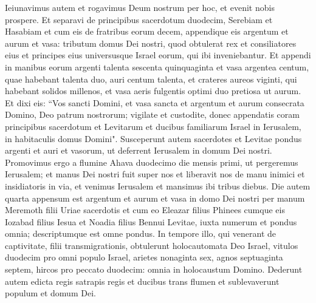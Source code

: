 \begin{biblechapter}
\verse Ieiunavimus autem et rogavimus Deum nostrum per hoc, et evenit nobis prospere. 
\verse Et separavi de principibus sacerdotum duodecim, Serebiam et Hasabiam et cum eis de fratribus eorum decem, 
\verse appendique eis argentum et aurum et vasa: tributum domus Dei nostri, quod obtulerat rex et consiliatores eius et principes eius universusque Israel eorum, qui ibi inveniebantur. 
\verse Et appendi in manibus eorum argenti talenta sescenta quinquaginta et vasa argentea centum, quae habebant talenta duo, auri centum talenta, 
\verse et crateres aureos viginti, qui habebant solidos millenos, et vasa aeris fulgentis optimi duo pretiosa ut aurum. 
\verse Et dixi eis: “Vos sancti Domini, et vasa sancta et argentum et aurum consecrata Domino, Deo patrum nostrorum; 
\verse vigilate et custodite, donec appendatis coram principibus sacerdotum et Levitarum et ducibus familiarum Israel in Ierusalem, in habitaculis domus Domini". 
\verse Susceperunt autem sacerdotes et Levitae pondus argenti et auri et vasorum, ut deferrent Ierusalem in domum Dei nostri. 
\verse Promovimus ergo a flumine Ahava duodecimo die mensis primi, ut pergeremus Ierusalem; et manus Dei nostri fuit super nos et liberavit nos de manu inimici et insidiatoris in via, 
\verse et venimus Ierusalem et mansimus ibi tribus diebus. 
\verse Die autem quarta appensum est argentum et aurum et vasa in domo Dei nostri per manum Meremoth filii Uriae sacerdotis et cum eo Eleazar filius Phinees cumque eis Iozabad filius Iesua et Noadia filius Bennui Levitae, 
\verse iuxta numerum et pondus omnia; descriptumque est omne pondus. In tempore illo,  
\verse qui venerant de captivitate, filii transmigrationis, obtulerunt holocautomata Deo Israel, vitulos duodecim pro omni populo Israel, arietes nonaginta sex, agnos septuaginta septem, hircos pro peccato duodecim: omnia in holocaustum Domino. 
\verse Dederunt autem edicta regis satrapis regis et ducibus trans flumen et sublevaverunt populum et domum Dei. 
\end{biblechapter}

